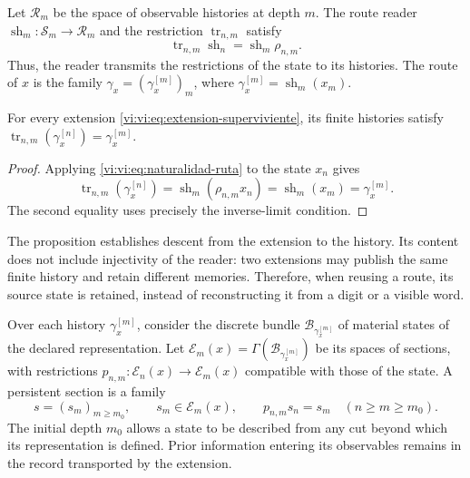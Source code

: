 Let $\mathcal R_m$ be the space of observable histories at depth $m$.
The route reader $\operatorname{sh}_m:\mathcal S_m\to\mathcal R_m$
and the restriction $\operatorname{tr}_{n,m}$ satisfy
\begin{equation}
 \operatorname{tr}_{n,m}\operatorname{sh}_n
 =\operatorname{sh}_m\rho_{n,m}.
 \label{vi:vi:eq:naturalidad-ruta}
\end{equation}
Thus, the reader transmits the restrictions of the state to its histories.
The route of $x$ is the family
$\gamma_x=(\gamma_x^{[m]})_m$, where
$\gamma_x^{[m]}=\operatorname{sh}_m(x_m)$.

\begin{proposition}
\label{vi:vi:prop:historia-compatible}
For every extension \eqref{vi:vi:eq:extension-superviviente}, its finite
histories satisfy
$\operatorname{tr}_{n,m}(\gamma_x^{[n]})=\gamma_x^{[m]}$.
\end{proposition}
\begin{proof}
Applying \eqref{vi:vi:eq:naturalidad-ruta} to the state $x_n$ gives
\[
 \operatorname{tr}_{n,m}(\gamma_x^{[n]})
 =\operatorname{sh}_m(\rho_{n,m}x_n)
 =\operatorname{sh}_m(x_m)=\gamma_x^{[m]}.
\]
The second equality uses precisely the inverse-limit condition.
\end{proof}

The proposition establishes descent from the extension to the history.
Its content does not include injectivity of the reader: two extensions
may publish the same finite history and retain different memories.
Therefore, when reusing a route, its source state is retained,
instead of reconstructing it from a digit or a visible word.

Over each history $\gamma_x^{[m]}$, consider the discrete bundle
$\mathcal B_{\gamma_x^{[m]}}$ of material states of the declared
representation. Let
$\mathscr E_m(x)=\Gamma(\mathcal B_{\gamma_x^{[m]}})$ be its spaces
of sections, with restrictions
$p_{n,m}:\mathscr E_n(x)\to\mathscr E_m(x)$ compatible with those
of the state. A persistent section is a family
\begin{equation}
 s=(s_m)_{m\geq m_0},\qquad s_m\in\mathscr E_m(x),\qquad
 p_{n,m}s_n=s_m\quad(n\geq m\geq m_0).
 \label{vi:vi:eq:seccion-persistente}
\end{equation}
The initial depth $m_0$ allows a state to be described from any
cut beyond which its representation is defined. Prior information
entering its observables remains in the record
transported by the extension.

